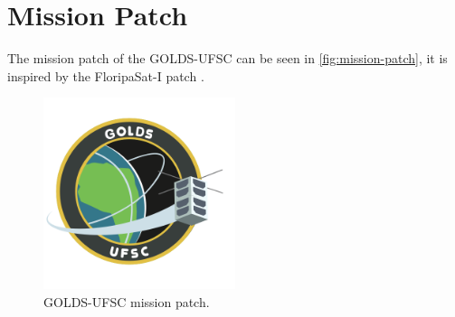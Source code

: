 \section{Mission Patch}

The mission patch of the GOLDS-UFSC can be seen in \autoref{fig:mission-patch}, it is inspired by the FloripaSat-I patch \cite{floripasat}.

\begin{figure}[!ht]
    \begin{center}
        \includegraphics[width=0.5\textwidth]{figures/golds-ufsc-patch.png}
        \caption{GOLDS-UFSC mission patch.}
        \label{fig:mission-patch}
    \end{center}
\end{figure}
